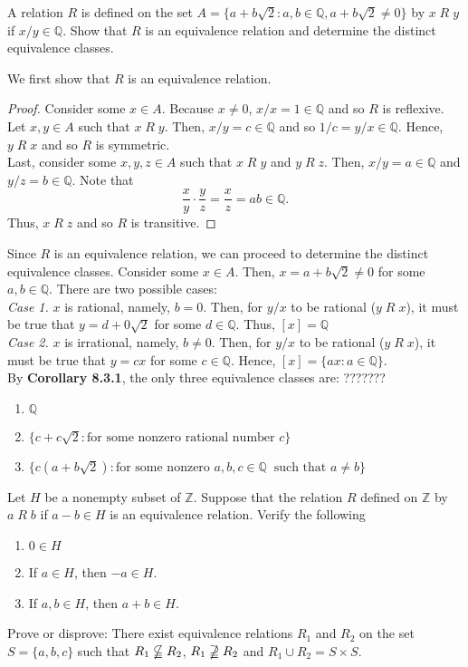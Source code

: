 \documentclass[12pt]{article}
\newcommand{\Z}{\mathbb{Z}}
\newcommand{\Q}{\mathbb{Q}}
\newenvironment{problem}[2][Problem]{\begin{trivlist}
		\item[\hskip \labelsep {\bfseries #1}\hskip \labelsep {\bfseries #2.}]}{\end{trivlist}}
\newenvironment{solution}[2][Solution]{\begin{trivlist}
		\item[\hskip \labelsep {\bfseries #1}\hskip \labelsep {\bfseries #2.}]}{\end{trivlist}}
\begin{document}
	\begin{problem}{32}
		A relation $R$ is defined on the set $A=\{a+b\sqrt{2}:a,b\in \Q, a+b\sqrt{2}\neq 0\}$ by $x\; R \; y$ if $x/y \in \Q$. Show that $R$ is an equivalence relation and determine the distinct equivalence classes.
		\begin{solution}{32}
			We first show that $R$ is an equivalence relation. 
			\begin{proof}
				Consider some $x\in A$. Because $x\neq 0$, $x/x = 1 \in \Q$ and so $R$ is reflexive. \\
				Let $x,y\in A$ such that $x\; R \;y$. Then, $x/y=c\in \Q$ and so $1/c = y/x \in \Q$. Hence, $y\; R \; x$ and so $R$ is symmetric.\\
				Last, consider some $x,y,z\in A$ such that $x\; R \;y$ and $y\; R \;z$. Then, $x/y = a \in \Q$ and $y/z = b \in \Q$. Note that
				\begin{equation*}
					\frac{x}{y} \cdot \frac{y}{z} = \frac{x}{z} = ab \in \Q.
				\end{equation*}
			Thus, $x\; R \; z$ and so $R$ is transitive.
			\end{proof}
			Since $R$ is an equivalence relation, we can proceed to determine the distinct equivalence classes. Consider some $x\in A$. Then, $x=a+b\sqrt{2}\neq 0$ for some $a,b\in \Q$. There are two possible cases:\\
			\textit{Case 1.} $x$ is rational, namely, $b=0$. Then, for $y/x$ to be rational ($y\; R \;x$), it must be true that $y=d+0\sqrt{2}$ for some $d\in \Q$. Thus, $[x] =\Q$\\
			\textit{Case 2.} $x$ is irrational, namely, $b\neq 0$. Then, for $y/x$ to be rational ($y\; R \;x$), it must be true that $y=cx$ for some $c\in \Q$. Hence, $[x] = \{ax:a\in \Q\}$.\\
			By \textbf{Corollary 8.3.1}, the only three equivalence classes are: ??????? 
			\begin{enumerate}[label=(\alph*)]
				\item $\Q$
				\item $\{c+c\sqrt{2}:\text{for some nonzero rational number } c\}$
				\item $\{c(a+b\sqrt{2}):\text{for some nonzero } a,b,c\in \Q\ \text{ such that } a\neq b\}$
			\end{enumerate}
		\end{solution}	
	\end{problem}

	\begin{problem}{34}
		Let $H$ be a nonempty subset of $\Z$. Suppose that the relation $R$ defined on $\Z$ by $a\; R \;b$ if $a-b \in H$ is an equivalence relation. Verify the following
		\begin{enumerate}[label=(\alph*)]
			\item $0\in H$
			\item If $a\in H$, then $-a\in H$.
			\item If $a,b\in H$, then $a+b\in H$.
		\end{enumerate}
	\end{problem}

	\begin{problem}{35}
		Prove or disprove: There exist equivalence relations $R_{1}$ and $R_{2}$ on the set $S=\{a,b,c\}$ such that $R_{1} \nsubseteqq R_{2}$, $R_{1} \nsupseteqq R_{2}$ and $R_{1}\cup R_{2} = S \times S$.
	\end{problem}
\end{document}

